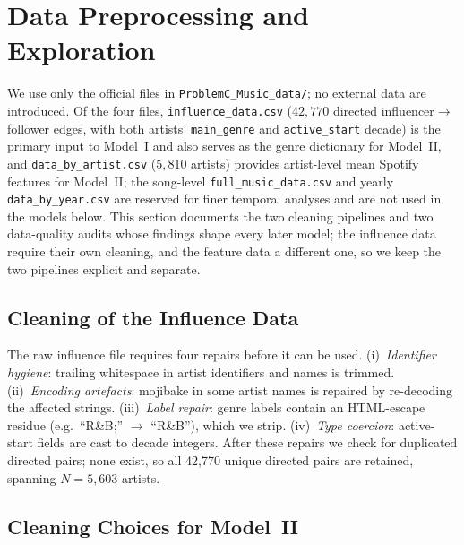 \section{Data Preprocessing and Exploration}\label{sec:data}

We use only the official files in \texttt{ProblemC\_Music\_data/}; no
external data are introduced. Of the four files,
\texttt{influence\_data.csv} ($42{,}770$ directed influencer$\to$follower
edges, with both artists' \texttt{main\_genre} and \texttt{active\_start}
decade) is the primary input to Model~I and also serves as the genre
dictionary for Model~II, and \texttt{data\_by\_artist.csv} ($5{,}810$
artists) provides artist-level mean Spotify features for Model~II; the
song-level \texttt{full\_music\_data.csv} and yearly
\texttt{data\_by\_year.csv} are reserved for finer temporal analyses and
are not used in the models below. This section documents the two cleaning
pipelines and two data-quality audits whose findings shape every later
model; the influence data require their own cleaning, and the feature
data a different one, so we keep the two pipelines explicit and separate.

\subsection{Cleaning of the Influence Data}\label{subsec:data-cleaning}

The raw influence file requires four repairs before it can be used.
(i)~\emph{Identifier hygiene}: trailing whitespace in artist identifiers and
names is trimmed. (ii)~\emph{Encoding artefacts}: mojibake in some artist
names is repaired by re-decoding the affected strings. (iii)~\emph{Label
repair}: genre labels contain an HTML-escape residue (e.g.\ ``R\&B;''
$\to$ ``R\&B''), which we strip. (iv)~\emph{Type coercion}: active-start
fields are cast to decade integers. After these repairs we check for
duplicated directed pairs; none exist, so all 42{,}770 unique directed pairs
are retained, spanning $N=5{,}603$ artists.

\subsection{Cleaning Choices for Model~II}\label{subsec:data-cleaning-features}

